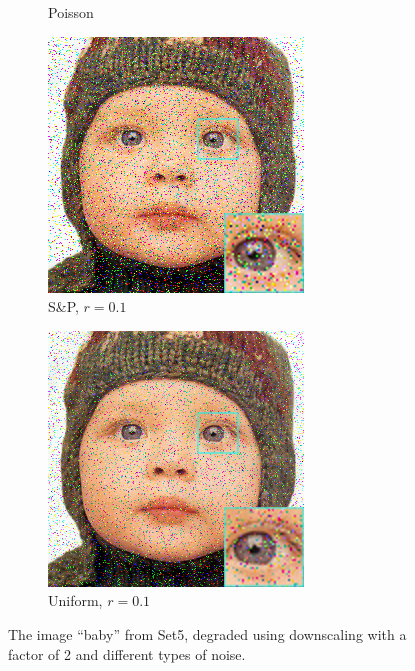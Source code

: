 \begin{figure}
\begin{subfigure}{0.24\textwidth}
		\caption{Poisson}
	\end{subfigure}
	\begin{subfigure}{0.24\textwidth}
		\includegraphics[width=\textwidth]{images/exp0.1/salt0.png}
		\caption{S\&P, $r=0.1$}
	\end{subfigure}
	\begin{subfigure}{0.24\textwidth}
		\includegraphics[width=\textwidth]{images/exp0.1/uniform0.png}
		\caption{Uniform, $r=0.1$}
	\end{subfigure}
	\caption{The image ``baby'' from Set5, degraded using downscaling with a factor of 2 and different types of noise.}
	\label{fig:exp0}
\end{figure}